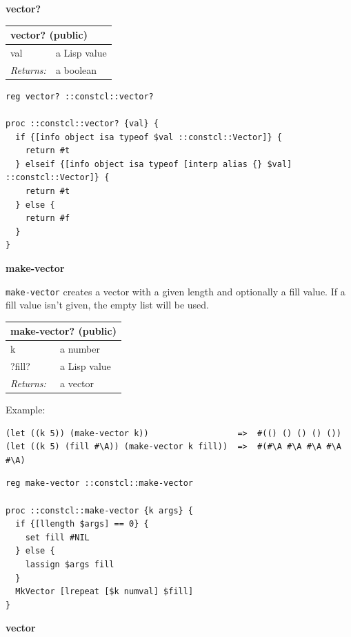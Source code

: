 \documentclass[twoside,9pt]{report}
\begin{document}
\textbf{vector?}

\begin{tabular}{ |l l| }
\hline
\multicolumn{2}{|l|}{vector? (public)} \\
\hline
val & a Lisp value \\
\textit{Returns:} & a boolean \\
\hline
\end{tabular}

\noindent\makebox[\linewidth]{\rule{\linewidth}{0.4pt}}
\begin{lstlisting}
reg vector? ::constcl::vector?
 
proc ::constcl::vector? {val} {
  if {[info object isa typeof $val ::constcl::Vector]} {
    return #t
  } elseif {[info object isa typeof [interp alias {} $val] ::constcl::Vector]} {
    return #t
  } else {
    return #f
  }
}
\end{lstlisting}
\noindent\makebox[\linewidth]{\rule{\linewidth}{0.4pt}}

\textbf{make-vector}


\texttt{make-vector} creates a vector with a given length and optionally a fill value. If a fill value isn't given, the empty list will be used.

\begin{tabular}{ |l l| }
\hline
\multicolumn{2}{|l|}{make-vector? (public)} \\
\hline
k & a number \\
?fill? & a Lisp value \\
\textit{Returns:} & a vector \\
\hline
\end{tabular}


Example:

\noindent\makebox[\linewidth]{\rule{\linewidth}{0.4pt}}
\begin{lstlisting}
(let ((k 5)) (make-vector k))                  =>  #(() () () () ())
(let ((k 5) (fill #\A)) (make-vector k fill))  =>  #(#\A #\A #\A #\A #\A)
\end{lstlisting}
\noindent\makebox[\linewidth]{\rule{\linewidth}{0.4pt}}
\noindent\makebox[\linewidth]{\rule{\linewidth}{0.4pt}}
\begin{lstlisting}
reg make-vector ::constcl::make-vector
 
proc ::constcl::make-vector {k args} {
  if {[llength $args] == 0} {
    set fill #NIL
  } else {
    lassign $args fill
  }
  MkVector [lrepeat [$k numval] $fill]
}
\end{lstlisting}
\noindent\makebox[\linewidth]{\rule{\linewidth}{0.4pt}}

\textbf{vector}
\end{document}

